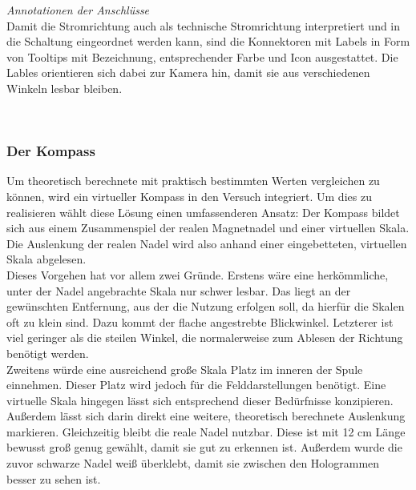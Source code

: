 \textit{Annotationen der Anschlüsse}\\
Damit die Stromrichtung auch als technische Stromrichtung interpretiert und in die Schaltung eingeordnet werden kann, sind die Konnektoren mit Labels in Form von Tooltips mit Bezeichnung, entsprechender Farbe und Icon ausgestattet. Die Lables orientieren sich dabei zur Kamera hin, damit sie aus verschiedenen Winkeln lesbar bleiben.

\vspace{8px}
\begin{center}
	\\
\end{center}
\vspace{6px}

\subsubsection{Der Kompass} 
\label{sec-4-2-4}
Um theoretisch berechnete mit praktisch bestimmten Werten vergleichen zu können, wird ein virtueller Kompass in den Versuch integriert. Um dies zu realisieren wählt diese Lösung einen umfassenderen Ansatz: Der Kompass bildet sich aus einem Zusammenspiel der realen Magnetnadel und einer virtuellen Skala. Die Auslenkung der realen Nadel wird also anhand einer eingebetteten, virtuellen Skala abgelesen.\\

Dieses Vorgehen hat vor allem zwei Gründe. Erstens wäre eine herkömmliche, unter der Nadel angebrachte Skala nur schwer lesbar. Das liegt an der gewünschten Entfernung, aus der die Nutzung erfolgen soll, da hierfür die Skalen oft zu klein sind. Dazu kommt der flache angestrebte Blickwinkel. Letzterer ist viel geringer als die steilen Winkel, die normalerweise zum Ablesen der Richtung benötigt werden.\\
\noindent\hspace*{5mm}
Zweitens würde eine ausreichend große Skala Platz im inneren der Spule einnehmen. Dieser Platz wird jedoch für die Felddarstellungen benötigt. Eine virtuelle Skala hingegen lässt sich entsprechend dieser Bedürfnisse konzipieren. Außerdem lässt sich darin direkt eine weitere, theoretisch berechnete Auslenkung markieren. Gleichzeitig bleibt die reale Nadel nutzbar. Diese ist mit 12 cm Länge bewusst groß genug gewählt, damit sie gut zu erkennen ist. Außerdem wurde die zuvor schwarze Nadel weiß überklebt, damit sie zwischen den Hologrammen besser zu sehen ist.\\

